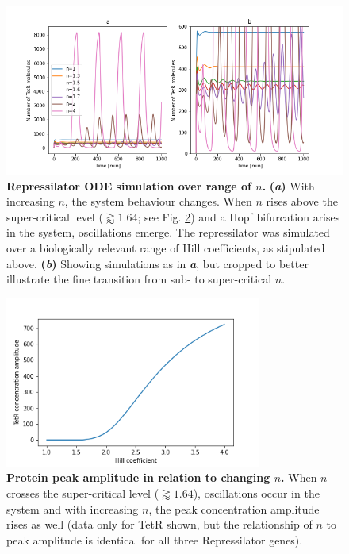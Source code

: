 \documentclass[runningheads,a4paper]{llncs}
\begin{document}
\begin{figure}
    \singlespacing
    \centering
    \includegraphics[width=\textwidth]{suplementary_information_and_code/Task3_figure2.png}
    \caption{\textbf{Repressilator ODE simulation over range of $n$.} \textbf{(\textit{a})} With increasing $n$, the system behaviour changes. When $n$ rises above the super-critical level ($\gtrapprox 1.64$; see Fig. \ref{fig:fig9}) and a Hopf bifurcation arises in the system, oscillations emerge. The repressilator was simulated over a biologically relevant range of Hill coefficients, as stipulated above. \textbf{(\textit{b})} Showing simulations as in \textbf{\textit{a}}, but cropped to better illustrate the fine transition from sub- to super-critical $n$.}
    \label{fig:fig8}
\end{figure}

\begin{figure}
    \singlespacing
    \centering
    \includegraphics[width=0.75\textwidth]{suplementary_information_and_code/Task3_figure3.png}
    \caption{\textbf{Protein peak amplitude in relation to changing $n$.} When $n$ crosses the super-critical level ($\gtrapprox 1.64$), oscillations occur in the system and with increasing $n$, the peak concentration amplitude rises as well (data only for TetR shown, but the relationship of $n$ to peak amplitude is identical for all three Repressilator genes).}
    \label{fig:fig9}
\end{figure}
\end{document}
